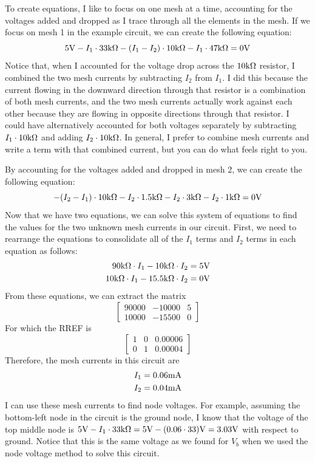 \par
To create equations, I like to focus on one mesh at a time, accounting for the voltages added and dropped as I trace through all the elements in the mesh. If we focus on mesh 1 in the example circuit, we can create the following equation: 
$$
5\textnormal{V} - I_1\cdot33\textnormal{k}\Omega -(I_1-I_2) \cdot 10\textnormal{k}\Omega - I_1\cdot47\textnormal{k}\Omega = 0\textnormal{V}
$$
Notice that, when I accounted for the voltage drop across the $10\textnormal{k}\Omega$ resistor, I combined the two mesh currents by subtracting $I_2$ from $I_1$. I did this because the current flowing in the downward direction through that resistor is a combination of both mesh currents, and the two mesh currents actually work against each other because they are flowing in opposite directions through that resistor. I could have alternatively accounted for both voltages separately by subtracting $I_1\cdot10\textnormal{k}\Omega$ and adding $I_2\cdot10\textnormal{k}\Omega$. In general, I prefer to combine mesh currents and write a term with that combined current, but you can do what feels right to you.
\par
By accounting for the voltages added and dropped in mesh 2, we can create the following equation:
$$
-(I_2-I_1) \cdot 10\textnormal{k}\Omega - I_2\cdot1.5\textnormal{k}\Omega - I_2\cdot3\textnormal{k}\Omega - I_2\cdot1\textnormal{k}\Omega = 0\textnormal{V}
$$
Now that we have two equations, we can solve this system of equations to find the values for the two unknown mesh currents in our circuit. First, we need to rearrange the equations to consolidate all of the $I_1$ terms and $I_2$ terms in each equation as follows:
\begin{align*}
90\textnormal{k}\Omega \cdot I_1 - 10\textnormal{k}\Omega \cdot I_2 &= 5\textnormal{V} \\
10\textnormal{k}\Omega \cdot I_1 - 15.5\textnormal{k}\Omega \cdot I_2 &= 0\textnormal{V}
\end{align*}
From these equations, we can extract the matrix
$$
\begin{bmatrix}
90000 & -10000 & 5 \\
10000 & -15500 & 0
\end{bmatrix}
$$
For which the RREF is 
$$
\begin{bmatrix}
1 & 0 & 0.00006 \\
0 & 1 & 0.00004
\end{bmatrix}
$$
Therefore, the mesh currents in this circuit are
\begin{align*}
I_1&=0.06\textnormal{mA} \\
I_2&=0.04\textnormal{mA}
\end{align*}
I can use these mesh currents to find node voltages. For example, assuming the bottom-left node in the circuit is the ground node, I know that the voltage of the top middle node is $5\textnormal{V}-I_1\cdot33\textnormal{k}\Omega = 5\textnormal{V}-(0.06\cdot33)\textnormal{V} = 3.03\textnormal{V}$ with respect to ground. Notice that this is the same voltage as we found for $V_b$ when we used the node voltage method to solve this circuit. 


